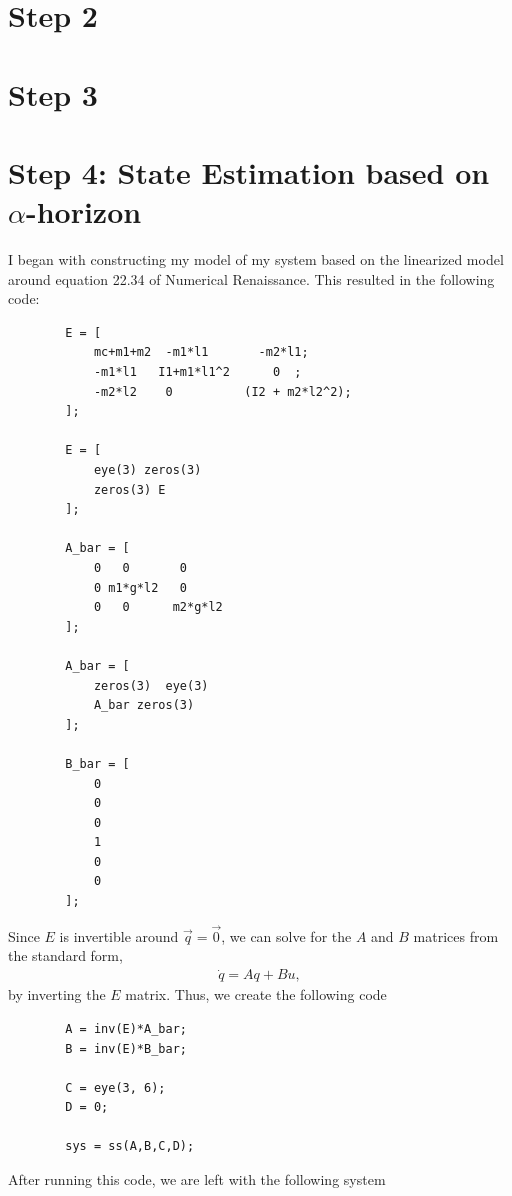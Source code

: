 \documentclass{article}
\theoremstyle{definition}
\begin{document}
    \section*{Step 2}
    
    \section*{Step 3}

    \section*{Step 4: State Estimation based on $\alpha$-horizon}
    I began with constructing my model of my system based on the linearized
    model around equation 22.34 of Numerical Renaissance. 
    This resulted in the following code:
    \begin{verbatim}
        E = [
            mc+m1+m2  -m1*l1       -m2*l1;
            -m1*l1   I1+m1*l1^2      0  ;
            -m2*l2    0          (I2 + m2*l2^2);
        ];

        E = [
            eye(3) zeros(3)
            zeros(3) E
        ];

        A_bar = [
            0   0       0
            0 m1*g*l2   0
            0   0      m2*g*l2
        ];

        A_bar = [ 
            zeros(3)  eye(3) 
            A_bar zeros(3)
        ];

        B_bar = [
            0
            0
            0
            1
            0
            0
        ];
    \end{verbatim}
    Since $E$ is invertible around $\vec q = \vec 0$, we can solve for 
    the $A$ and $B$ matrices from the standard form,
    \begin{eqnarray*}
        \dot q = A q + B u,
    \end{eqnarray*}
    by inverting the $E$ matrix. 
    Thus, we create the following code
    \begin{verbatim}
        A = inv(E)*A_bar;
        B = inv(E)*B_bar;

        C = eye(3, 6);
        D = 0;

        sys = ss(A,B,C,D);
    \end{verbatim}
    After running this code, we are left with the following system
\end{document}
